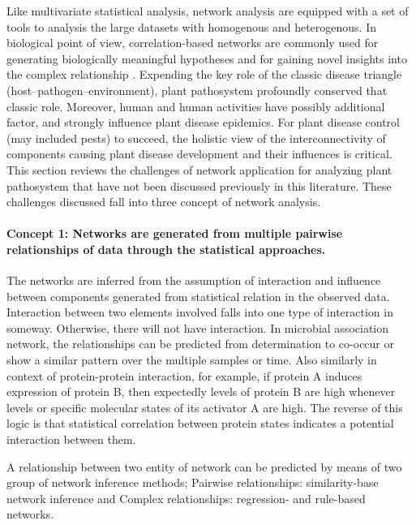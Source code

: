Like multivariate statistical analysis, network analysis are equipped with a set of tools to analysis the large datasets with homogenous and heterogenous. In biological point of view, correlation-based networks are commonly used for generating biologically meaningful hypotheses and for gaining novel insights into the complex relationship . Expending the key role of the classic disease triangle (host–pathogen–environment), plant pathosystem profoundly conserved that classic role. Moreover, human and human activities have possibly additional factor, and strongly influence plant disease epidemics. For plant disease control (may included pests) to succeed, the holistic view of the interconnectivity of components causing plant disease development and their influences is critical. This section reviews the challenges of network application for analyzing plant pathosystem that have not been discussed previously in this literature. These challenges discussed fall into three concept of network analysis.

\paragraph{Concept 1: Networks are generated from multiple pairwise relationships of data through the statistical approaches.} 

The networks are inferred from the assumption of interaction and influence between components generated from statistical relation in the observed data. Interaction between two elements involved falls into one type of interaction in someway. Otherwise, there will not have interaction. In microbial association network, the relationships can be predicted from determination to co-occur or show a similar pattern over the multiple samples or time. Also similarly in context of protein-protein interaction, for example, if protein A induces expression of protein B, then expectedly levels of protein B are high whenever levels or specific molecular states of its activator A are high. The reverse of this logic is that statistical correlation between protein states indicates a potential interaction between them.

A relationship between two entity of network can be predicted by means of two group of network inference methods; Pairwise relationships: similarity-base network inference and Complex relationships: regression- and rule-based networks. 

